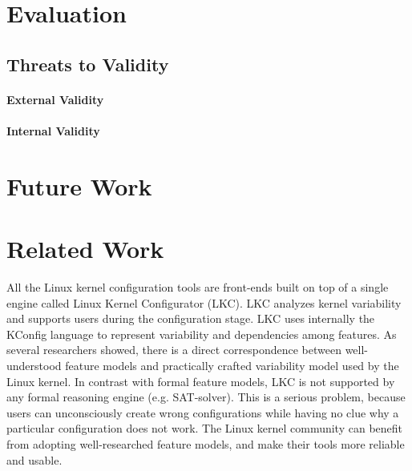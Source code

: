 \documentclass{chi2009}
\newcommand{\todo}[1]{\textsf{\textbf{\textcolor{Orange}{[[#1]]}}}}
\begin{document}
\section{Evaluation}\label{sec:evaluation}


\subsection{Threats to Validity}

\paragraph{External Validity}

\paragraph{Internal Validity}

\section{Future Work}\label{sec:futurework}



\section{Related Work}\label{sec:relatedwork}

All the Linux kernel configuration tools are front-ends built on top of a single engine called Linux Kernel Configurator (LKC). LKC analyzes kernel variability and supports users during the configuration stage. LKC uses internally the KConfig language to represent variability and dependencies among features. As several researchers \cite{sincero:lkc:2008,she:kernel:2010} showed, there is a direct correspondence between well-understood feature models and practically crafted variability model used by the Linux kernel. In contrast with formal feature models, LKC is not supported by any formal reasoning engine (e.g. SAT-solver). This is a serious problem, because users can unconsciously create wrong configurations while having no clue why a particular configuration does not work. The Linux kernel community can benefit from adopting well-researched feature models, and make their tools more reliable and usable.
\end{document}
